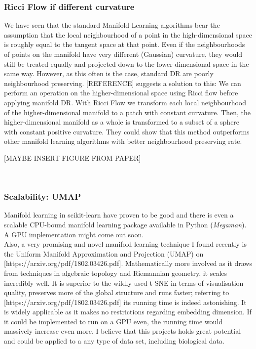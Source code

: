 \documentclass[journal, a4paper]{IEEEtran}
\begin{document}
\subsubsection{Ricci Flow if different curvature} 
We have seen that the standard Manifold Learning algorithms bear the assumption that the local neighbourhood of a point in the high-dimensional space is roughly equal to the tangent space at that point. Even if the neighbourhoods of points on the manifold have very different (Gaussian) curvature, they would still be treated equally and projected down to the lower-dimensional space in the same way. However, as this often is the case, standard DR are poorly neighbourhood preserving. [REFERENCE] suggests a solution to this: We can perform an operation on the higher-dimensional space using Ricci flow before applying manifold DR. With Ricci Flow we transform each local neighbourhood of the higher-dimensional manifold to a patch with constant curvature. Then, the higher-dimensional manifold as a whole is transformed to a subset of a sphere with constant positive curvature. They could show that this method outperforms other manifold learning algorithms with better neighbourhood preserving rate.%

[MAYBE INSERT FIGURE FROM PAPER]

\\
\subsubsection{Scalability: UMAP}

Manifold learning in scikit-learn have proven to be good and there is even a scalable CPU-bound manifold learning package available in Python (\textit{Megaman}). A GPU implementation might come out soon.\\
Also, a very promising and novel manifold learning technique I found recently is the Uniform Manifold Approximation and Projection (UMAP) on [https://arxiv.org/pdf/1802.03426.pdf]. Mathematically more involved as it draws from techniques in algebraic topology and Riemannian geometry, it scales incredibly well. It is superior to the wildly-used t-SNE in terms of visualisation quality, preserves more of the global structure and runs faster; referring to [https://arxiv.org/pdf/1802.03426.pdf] its running time is indeed astonishing. It is widely applicable as it makes no restrictions regarding embedding dimension. If it could be implemented to run on a GPU even, the running time would massively increase even more. I believe that this projects holds great potential and could be applied to a any type of data set, including biological data.
\end{document}

